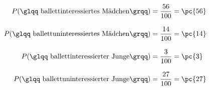 \begin{exercise}
    \begin{equation*}
      \begin{split}
        P(\text{\glqq ballettinteressiertes Mädchen\grqq})   &= \frac{56}{100} = \pc{56} \\[2ex]
        P(\text{\glqq ballettuninteressiertes Mädchen\grqq}) &= \frac{14}{100} = \pc{14} \\[2ex]
        P(\text{\glqq ballettinteressierter Junge\grqq})     &= \frac{3}{100}  = \pc{3}  \\[2ex]
        P(\text{\glqq ballettuninteressierter Junge\grqq})   &= \frac{27}{100} = \pc{27}
      \end{split}
    \end{equation*}
  \fi
\end{exercise}
